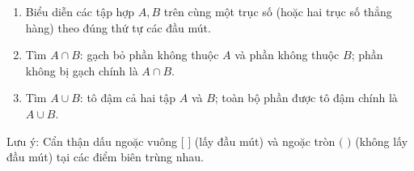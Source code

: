 \begin{enumerate}
\item Biểu diễn các tập hợp $A, B$ trên cùng một trục số (hoặc hai trục số thẳng hàng) theo đúng thứ tự các đầu mút.
\item Tìm $A \cap B$: gạch bỏ phần không thuộc $A$ và phần không thuộc $B$; phần không bị gạch chính là $A \cap B$.
\item Tìm $A \cup B$: tô đậm cả hai tập $A$ và $B$; toàn bộ phần được tô đậm chính là $A \cup B$.
\end{enumerate}
Lưu ý: Cẩn thận dấu ngoặc vuông $[$ $]$ (lấy đầu mút) và ngoặc tròn $($ $)$ (không lấy đầu mút) tại các điểm biên trùng nhau.
